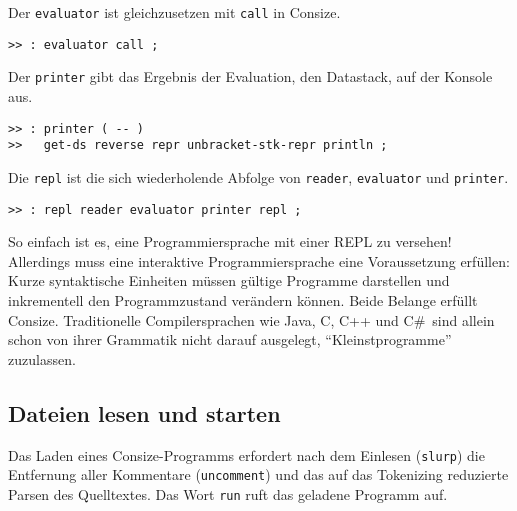 Der \verb|evaluator| ist gleichzusetzen mit \verb|call| in Consize. 

\begin{verbatim}  
>> : evaluator call ;
\end{verbatim}

Der \verb|printer| gibt das Ergebnis der Evaluation, den Datastack, auf der Konsole aus.

\begin{verbatim}
>> : printer ( -- )
>>   get-ds reverse repr unbracket-stk-repr println ;
\end{verbatim}

Die \verb|repl| ist die sich wiederholende Abfolge von \verb|reader|, \verb|evaluator| und \verb|printer|.

\begin{verbatim}  
>> : repl reader evaluator printer repl ;
\end{verbatim}

So einfach ist es, eine Programmiersprache mit einer REPL zu versehen! Allerdings muss eine interaktive Programmiersprache eine Voraussetzung erfüllen: Kurze syntaktische Einheiten müssen gültige Programme darstellen und inkrementell den Programmzustand verändern können. 
Beide Belange erfüllt Consize. Traditionelle Compilersprachen wie Java, C, C++ und C\#\ sind allein schon von ihrer Grammatik nicht darauf ausgelegt, "`Kleinstprogramme"' zuzulassen.

\subsection{Dateien lesen und starten}
\label{Sec:Dateien}

%

Das Laden eines Consize-Programms erfordert nach dem Einlesen (\verb|slurp|) die Entfernung aller Kommentare (\verb|uncomment|) und das auf das Tokenizing reduzierte Parsen des Quelltextes. Das Wort \verb|run| ruft das geladene Programm auf.


